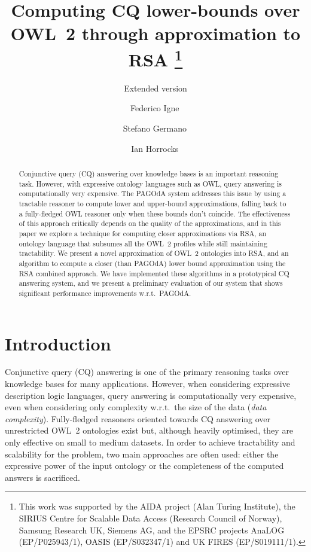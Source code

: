\documentclass[runningheads]{llncs}
\newcommand{\pagoda}{\mbox{PAGOdA}\xspace}
\begin{document}
%
\title{
    Computing CQ lower-bounds over OWL~2 through approximation to RSA
    \thanks{
        This work was supported by the AIDA project (Alan Turing Institute), the SIRIUS Centre for Scalable Data Access (Research Council of Norway), Samsung Research UK, Siemens AG, and the EPSRC projects AnaLOG (EP/P025943/1), OASIS (EP/S032347/1) and UK FIRES (EP/S019111/1).
    }
}
\subtitle{Extended version}
%
\author{
    Federico Igne\, \and
    Stefano Germano\, \and
    Ian Horrocks\,
}
%
\maketitle
%
\begin{abstract}

    Conjunctive query (CQ) answering over knowledge bases is an important reasoning task.
    However, with expressive ontology languages such as OWL, query answering is computationally very expensive.
    The \pagoda system addresses this issue by using a tractable reasoner to compute lower and upper-bound approximations, falling back to a fully-fledged OWL reasoner only when these bounds don't coincide.
    The effectiveness of this approach critically depends on the quality of the approximations, and in this paper we explore a technique for computing closer approximations via RSA, an ontology language that subsumes all the OWL~2 profiles while still maintaining tractability.
    We present a novel approximation of OWL~2 ontologies into RSA, and an algorithm to compute a closer (than \pagoda) lower bound approximation using the RSA combined approach.
    We have implemented these algorithms in a prototypical CQ answering system, and we present a preliminary evaluation of our system that shows significant performance improvements w.r.t.\ \pagoda.

\end{abstract}

\section{Introduction}

Conjunctive query (CQ) answering is one of the primary reasoning tasks over knowledge bases for many applications.
However, when considering expressive description logic languages, query answering is computationally very expensive, even when considering only complexity w.r.t.\ the size of the data (\emph{data complexity}).
Fully-fledged reasoners oriented towards CQ answering over unrestricted OWL~2 ontologies exist but, although heavily optimised, they are only effective on small to medium datasets.
In order to achieve tractability and scalability for the problem, two main approaches are often used: either the expressive power of the input ontology or the completeness of the computed answers is sacrificed.
\end{document}
